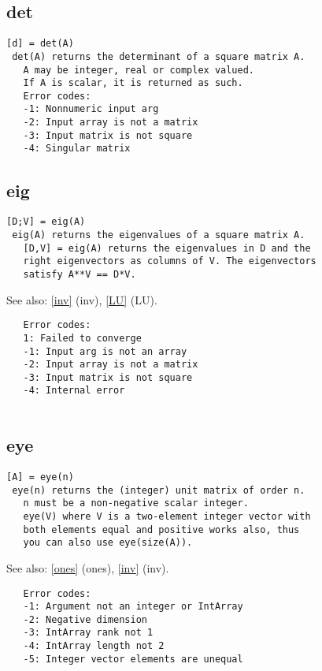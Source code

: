 \documentclass[a4paper]{article}
\begin{document}
\subsection{det\label{det}}

\begin{tscreen}
\begin{verbatim}
[d] = det(A)
 det(A) returns the determinant of a square matrix A.
   A may be integer, real or complex valued.
   If A is scalar, it is returned as such.
   Error codes:
   -1: Nonnumeric input arg
   -2: Input array is not a matrix
   -3: Input matrix is not square
   -4: Singular matrix 
\end{verbatim}
\end{tscreen}



\subsection{eig\label{eig}}

\begin{tscreen}
\begin{verbatim}
[D;V] = eig(A)
 eig(A) returns the eigenvalues of a square matrix A.
   [D,V] = eig(A) returns the eigenvalues in D and the
   right eigenvectors as columns of V. The eigenvectors
   satisfy A**V == D*V.
\end{verbatim}

See also: \ref{inv} {(inv)}, \ref{LU} {(LU)}.
\begin{verbatim}
   Error codes:
   1: Failed to converge
   -1: Input arg is not an array
   -2: Input array is not a matrix
   -3: Input matrix is not square
   -4: Internal error
   
\end{verbatim}
\end{tscreen}



\subsection{eye\label{eye}}

\begin{tscreen}
\begin{verbatim}
[A] = eye(n)
 eye(n) returns the (integer) unit matrix of order n.
   n must be a non-negative scalar integer.
   eye(V) where V is a two-element integer vector with
   both elements equal and positive works also, thus
   you can also use eye(size(A)).
\end{verbatim}

See also: \ref{ones} {(ones)}, \ref{inv} {(inv)}.
\begin{verbatim}
   Error codes:
   -1: Argument not an integer or IntArray
   -2: Negative dimension
   -3: IntArray rank not 1
   -4: IntArray length not 2
   -5: Integer vector elements are unequal
   
\end{verbatim}
\end{tscreen}
\end{document}
